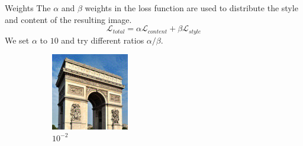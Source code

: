 \documentclass[12pt]{beamer}
\begin{document}
    \begin{frame}{Weights}
        The $\alpha$ and $\beta$ weights in the loss function are used to distribute the style and content of the resulting image.
        $$\mathcal{L}_{total} = \alpha \mathcal{L}_{content} + \beta \mathcal{L}_{style}$$
        We set $\alpha$ to $10$ and try different ratios $\alpha/\beta$.
    \end{frame}
    
    \begin{frame}
        \begin{figure}[ht]
            \centering
            \begin{subfigure}[b]{0.25\textwidth}
                \centering
                \includegraphics[width=\textwidth]{resources/gatys/weights/sun-trees-paris-10-2.png}
                \caption{$10^{-2}$}
            \end{subfigure}
            \hfill
            \begin{subfigure}[b]{0.25\textwidth}
                \centering

\end{subfigure}
\end{figure}
\end{frame}
\end{document}
